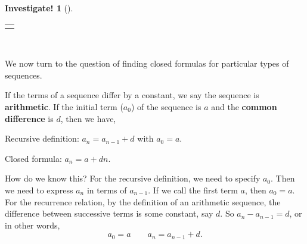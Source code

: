 \documentclass[12pt,]{book}
\newcommand{\terminology}[1]{\textbf{#1}}
\theoremstyle{plain}
\theoremstyle{definition}
\theoremstyle{definition}
\theoremstyle{definition}
\newtheorem{investigation}[project]{Investigate!}
\numberwithin{equation}{chapter}
\newlength{\panelmax}
\newcommand{\vtx}[2]{node[fill,circle,inner sep=0pt, minimum size=4pt,label=#1:#2]{}}
\renewcommand{\v}{\vtx{above}{}}
\begin{document}
\begin{investigation}[]
\begin{enumerate}
{\begin{lrbox}{\panelboxAimage}
{{
}
}\end{lrbox}
\ifdefined\phAimage\else\newlength{\phAimage}\fi%
\setlength{\phAimage}{\ht\panelboxAimage+\dp\panelboxAimage}
\settototalheight{\phAimage}{\usebox{\panelboxAimage}}
\setlength{\panelmax}{\maxof{\panelmax}{\phAimage}}
\leavevmode%
\setlength{\tabcolsep}{0\linewidth}
\par\medskip\noindent
\hspace*{0.05\linewidth}%
\begin{tabular}{@{}*{1}{c}@{}}
\begin{minipage}[c][\panelmax][t]{0.9\linewidth}\usebox{\panelboxAimage}\end{minipage}\end{tabular}\\
}%
%
\end{enumerate}
%
\end{investigation}
\hypertarget{p-101}{}%
We now turn to the question of finding closed formulas for particular types of sequences.%
\begin{assemblage}\label{assemblage-3}
\hypertarget{p-102}{}%
If the terms of a sequence differ by a constant, we say the sequence is \terminology{arithmetic}. If the initial term (\(a_0\)) of the sequence is \(a\) and the \terminology{common difference} is \(d\), then we have,%
\par
\hypertarget{p-103}{}%
Recursive definition: \(a_n = a_{n-1} + d\) with \(a_0 = a\).%
\par
\hypertarget{p-104}{}%
Closed formula: \(a_n = a + dn\).%
\end{assemblage}
\hypertarget{p-105}{}%
How do we know this? For the recursive definition, we need to specify \(a_0\). Then we need to express \(a_n\) in terms of \(a_{n-1}\). If we call the first term \(a\), then \(a_0 = a\). For the recurrence relation, by the definition of an arithmetic sequence, the difference between successive terms is some constant, say \(d\). So \(a_n - a_{n-1} = d\), or in other words,%
\begin{equation*}
a_0 = a \qquad a_n=a_{n-1}+d.
\end{equation*}
\end{document}
